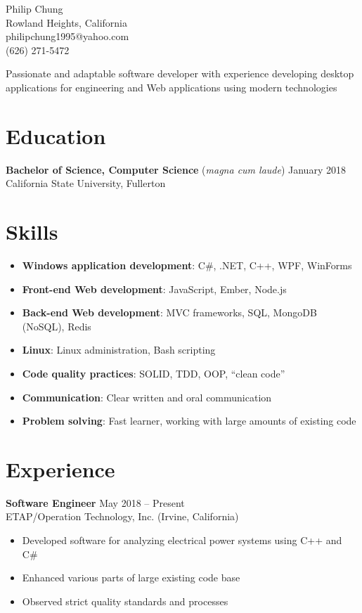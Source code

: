 \documentclass[10pt]{article}
\newcommand{\baseheader}[3]{#1 \hfill #2 \\ #3}
\newcommand{\locheader}[4]{\baseheader{\textbf{#1}}{#2}{#3 (#4)}}
\begin{document}
	\begin{center}
		{\LARGE Philip Chung} \\
		Rowland Heights, California \\
		philipchung1995@yahoo.com \\
		(626) 271-5472 \\
	\end{center}

	Passionate and adaptable software developer with experience developing desktop applications for engineering and Web applications using modern technologies

	\section*{Education}

	\baseheader{\textbf{Bachelor of Science, Computer Science} (\textit{magna cum laude})}{January 2018}{California State University, Fullerton}

	\section*{Skills}

	\newcommand{\skillitem}[2]{\item \textbf{#1}: #2}

	\begin{itemize}
		\skillitem{Windows application development}{C\#, .NET, C++, WPF, WinForms}
		\skillitem{Front-end Web development}{JavaScript, Ember, Node.js}
		\skillitem{Back-end Web development}{MVC frameworks, SQL, MongoDB (NoSQL), Redis}
		\skillitem{Linux}{Linux administration, Bash scripting}
		\skillitem{Code quality practices}{SOLID, TDD, OOP, ``clean code''}
		\skillitem{Communication}{Clear written and oral communication}
		\skillitem{Problem solving}{Fast learner, working with large amounts of existing code}
	\end{itemize}

	\section*{Experience}

	\locheader{Software Engineer}{May 2018 -- Present}{ETAP/Operation Technology, Inc.}{Irvine, California}

	\begin{itemize}
		\item Developed software for analyzing electrical power systems using C++ and C\#
		\item Enhanced various parts of large existing code base
		\item Observed strict quality standards and processes
	\end{itemize}
\end{document}
